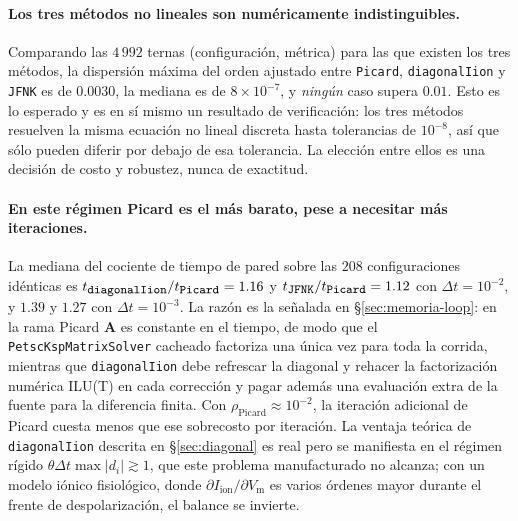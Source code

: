 \documentclass[11pt,a4paper]{article}
\newcommand{\code}[1]{\texttt{\small #1}}
\newcommand{\Vm}{V_{\text{m}}}
\newcommand{\Iion}{I_{\mathrm{ion}}}
\newcommand{\Aimp}{\mathbf{A}}
\begin{document}
\paragraph{Los tres métodos no lineales son numéricamente indistinguibles.}
Comparando las $4\,992$ ternas (configuración, métrica) para las que existen los tres métodos,
la dispersión máxima del orden ajustado entre \code{Picard}, \code{diagonalIion} y \code{JFNK}
es de $0.0030$, la mediana es de $8\times10^{-7}$, y \emph{ningún} caso supera $0.01$. Esto es
lo esperado y es en sí mismo un resultado de verificación: los tres métodos resuelven la misma
ecuación no lineal discreta hasta tolerancias de $10^{-8}$, así que sólo pueden diferir por
debajo de esa tolerancia. La elección entre ellos es una decisión de costo y robustez, nunca
de exactitud.

\paragraph{En este régimen Picard es el más barato, pese a necesitar más iteraciones.}
La mediana del cociente de tiempo de pared sobre las $208$ configuraciones idénticas es
$t_{\code{diagonalIion}}/t_{\code{Picard}}=1.16$ y $t_{\code{JFNK}}/t_{\code{Picard}}=1.12$
con $\Delta t=10^{-2}$, y $1.39$ y $1.27$ con $\Delta t=10^{-3}$. La razón es la señalada en
\S\ref{sec:memoria-loop}: en la rama Picard $\Aimp$ es constante en el tiempo, de modo que el
\code{PetscKspMatrixSolver} cacheado factoriza una única vez para toda la corrida, mientras que
\code{diagonalIion} debe refrescar la diagonal y rehacer la factorización numérica ILU(T) en
cada corrección y pagar además una evaluación extra de la fuente para la diferencia finita.
Con $\rho_{\text{Picard}}\approx10^{-2}$, la iteración adicional de Picard cuesta menos que
ese sobrecosto por iteración. La ventaja teórica de \code{diagonalIion} descrita en
\S\ref{sec:diagonal} es real pero se manifiesta en el régimen rígido
$\theta\Delta t\max|d_i|\gtrsim1$, que este problema manufacturado no alcanza; con un modelo
iónico fisiológico, donde $\partial\Iion/\partial\Vm$ es varios órdenes mayor durante el
frente de despolarización, el balance se invierte.
\end{document}

